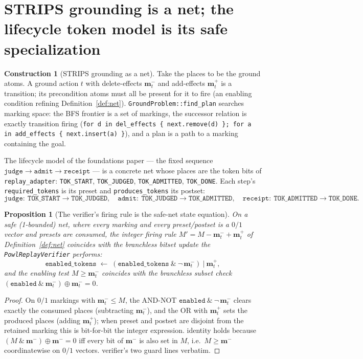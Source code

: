\documentclass[11pt,oneside]{book}
\theoremstyle{definition}
\newtheorem{construction}{Construction}[chapter]
\theoremstyle{plain}
\newtheorem{proposition}[theorem]{Proposition}
\theoremstyle{remark}
\newcommand{\preset}{\mathbf{m}^{-}}
\newcommand{\postset}{\mathbf{m}^{+}}
\newcommand{\code}[1]{\texttt{#1}}
\begin{document}
\section{STRIPS grounding is a net; the lifecycle token model is its safe specialization}

\begin{construction}[STRIPS grounding as a net]\label{con:strips}
Take the places to be the ground atoms. A ground action $t$ with delete-effects $\preset_{t}$ and add-effects $\postset_{t}$ is a transition; its precondition atoms must all be
present for it to fire (an enabling condition refining Definition~\ref{def:net}).%
\code{GroundProblem::find\_plan} searches marking space: the BFS frontier is a set of markings,
the successor relation is exactly transition firing (\code{for d in del\_effects \{
next.remove(d) \}; for a in add\_effects \{ next.insert(a) \}}), and a plan is a path to a
marking containing the goal.
\end{construction}

The lifecycle model of the foundations paper --- the fixed sequence
$\code{judge}\to\code{admit}\to\code{receipt}$ --- is a concrete net whose places are the
token bits of \code{replay\_adapter}: \code{TOK\_START}, \code{TOK\_JUDGED},
\code{TOK\_ADMITTED}, \code{TOK\_DONE}. Each step's \code{required\_tokens} is its preset and
\code{produces\_tokens} its postset:
\[
\code{judge}:\ \code{TOK\_START}\!\to\!\code{TOK\_JUDGED},\quad
\code{admit}:\ \code{TOK\_JUDGED}\!\to\!\code{TOK\_ADMITTED},\quad
\code{receipt}:\ \code{TOK\_ADMITTED}\!\to\!\code{TOK\_DONE}.
\]

\begin{proposition}[The verifier's firing rule is the safe-net state equation]\label{prop:safe}
On a \emph{safe} (1-bounded) net, where every marking and every preset/postset is a $0/1$
vector and presets are consumed, the integer firing rule
$M'=M-\preset_{t}+\postset_{t}$ of Definition~\ref{def:net} coincides with the
branchless bitset update the \code{PowlReplayVerifier} performs:%
\[
\code{enabled\_tokens}\;\gets\;(\code{enabled\_tokens}\ \&\ \lnot\,\preset_{t})\ |\ \postset_{t},
\]
and the enabling test $M\ge\preset_{t}$ coincides with the branchless subset check
$(\code{enabled}\ \&\ \preset_{t})\oplus \preset_{t}=0$.%
\end{proposition}

\begin{proof}
On $0/1$ markings with $\preset_{t}\le M$, the AND-NOT $\code{enabled}\ \&\ \lnot\,\preset_{t}$ clears exactly the consumed places (subtracting $\preset_{t}$), and the OR with
$\postset_{t}$ sets the produced places (adding $\postset_{t}$); when preset and postset are
disjoint from the retained marking this is bit-for-bit the integer expression.%
identity holds because $(M\ \&\ \preset)\oplus\preset=0$ iff every bit of $\preset$ is
also set in $M$, i.e.\ $M\ge\preset$ coordinatewise on $0/1$ vectors.%
verifier's two guard lines verbatim. \end{proof}
\end{document}
